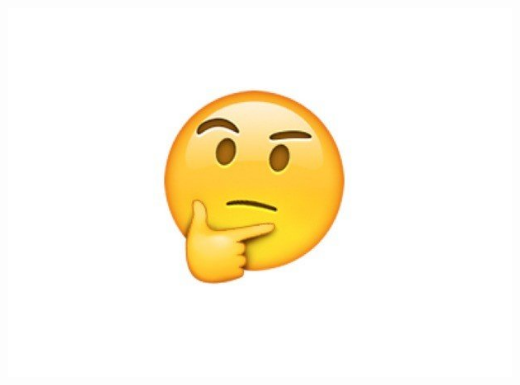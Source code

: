 \documentclass{beamer}
\begin{document}
\begin{frame}
\begin{columns}[c]
	\includegraphics[width=\textwidth]{1}
\end{columns}
		
	\end{frame}
\end{document}
